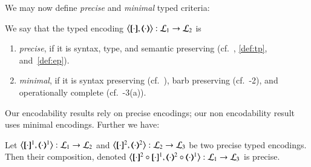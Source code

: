 

We may now define \emph{precise} and \emph{minimal} typed criteria: 

\smallskip 

\begin{definition}\rm\label{def:goodenc}
We say that 
	the typed encoding 
	$\enco{\map{\cdot}, \mapt{\cdot} %
	}: \tyl{L}_1 \to \tyl{L}_2$ is 
	\begin{enumerate}[$\bullet$]
	\item \emph{precise}, if it is syntax, type, and semantic preserving (cf.~, \ref{def:tp}, and~\ref{def:ep}).
	\item \emph{minimal}, if it is syntax preserving 
	(cf.~),
	barb preserving (cf.~-2), 
	and operationally complete (cf.~-3(a)).
	\end{enumerate}
\end{definition}

\smallskip 

\noi %
Our encodability results %
rely on precise encodings; 
our non encodability result %
uses minimal encodings.
Further we have:

\smallskip 

\begin{proposition}\rm
	\label{pro:composition}
	Let %
	$\enco{\map{\cdot}^{1}, \mapt{\cdot}^{1}%
	}: \tyl{L}_1 \to \tyl{L}_2$
	and 
	$\enco{\map{\cdot}^{2}, \mapt{\cdot}^{2}%
	}: \tyl{L}_2 \to \tyl{L}_3$
	be two precise typed encodings.
	Then their composition, denoted 
	$\enco{\map{\cdot}^{2} \circ \map{\cdot}^{1}, \mapt{\cdot}^{2} \circ \mapt{\cdot}^{1} %
	}: \tyl{L}_1 \to \tyl{L}_3$
	is precise. 
\end{proposition}

